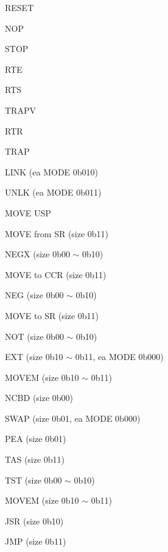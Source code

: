 \begin{DoxyRefList}
R\-E\-S\-E\-T 

N\-O\-P 

S\-T\-O\-P 

R\-T\-E 

R\-T\-S 

T\-R\-A\-P\-V 

R\-T\-R 

T\-R\-A\-P 

L\-I\-N\-K (ea M\-O\-D\-E 0b010) 

U\-N\-L\-K (ea M\-O\-D\-E 0b011) 

M\-O\-V\-E U\-S\-P 

M\-O\-V\-E from S\-R (size 0b11) 

N\-E\-G\-X (size 0b00 $\sim$ 0b10) 

M\-O\-V\-E to C\-C\-R (size 0b11) 

N\-E\-G (size 0b00 $\sim$ 0b10) 

M\-O\-V\-E to S\-R (size 0b11) 

N\-O\-T (size 0b00 $\sim$ 0b10) 

E\-X\-T (size 0b10 $\sim$ 0b11, ea M\-O\-D\-E 0b000) 

M\-O\-V\-E\-M (size 0b10 $\sim$ 0b11) 

N\-C\-B\-D (size 0b00) 

S\-W\-A\-P (size 0b01, ea M\-O\-D\-E 0b000) 

P\-E\-A (size 0b01) 

T\-A\-S (size 0b11) 

T\-S\-T (size 0b00 $\sim$ 0b10) 

M\-O\-V\-E\-M (size 0b10 $\sim$ 0b11) 

J\-S\-R (size 0b10) 

J\-M\-P (size 0b11) 
\end{DoxyRefList}